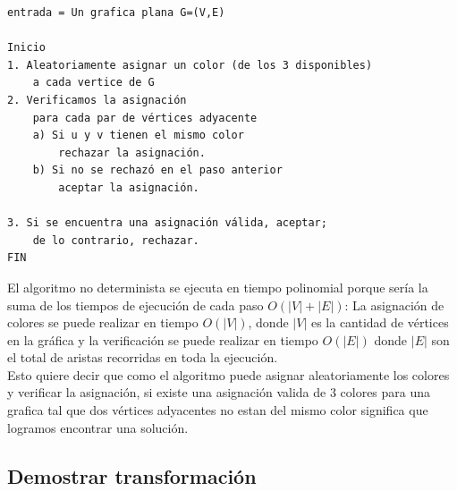 \begin{verbatim}
entrada = Un grafica plana G=(V,E)

Inicio
1. Aleatoriamente asignar un color (de los 3 disponibles) 
    a cada vertice de G
2. Verificamos la asignación
    para cada par de vértices adyacente
    a) Si u y v tienen el mismo color
        rechazar la asignación.
    b) Si no se rechazó en el paso anterior
        aceptar la asignación.

3. Si se encuentra una asignación válida, aceptar; 
    de lo contrario, rechazar.
FIN
\end{verbatim}

El algoritmo no determinista se ejecuta en tiempo polinomial porque sería la suma de los 
tiempos de ejecución de cada paso $O(|V| + |E|)$: La asignación de colores se puede 
realizar en tiempo $O(|V|)$, donde $|V|$ es la cantidad de vértices en la gráfica y la
verificación se puede realizar en tiempo $O(|E|)$ donde $|E|$ son el total de aristas
recorridas en toda la ejecución.\\ 

Esto quiere decir que como el algoritmo puede asignar aleatoriamente los colores y verificar 
la asignación, si existe una asignación valida de 3 colores para una grafica tal que dos 
vértices adyacentes no estan del mismo color significa que logramos encontrar una solución. 



\subsection{\textcolor{Contraste4}{Demostrar transformación}}

